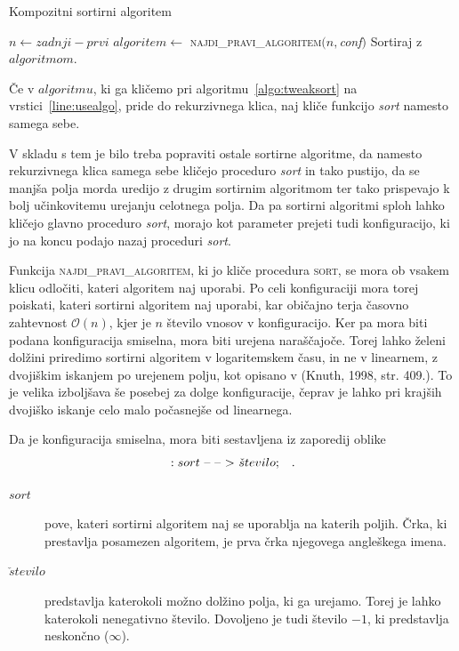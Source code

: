 \documentclass[a4paper,oneside,12pt]{article}
\newcommand{\konfarrow}{\mbox{--}~\mbox{--}~\mbox{\ensuremath{>}}}
\newcommand{\edot}{\;\;\;.}
\begin{document}
\begin{algorithm}[h!t!]
  \caption{Kompozitni sortirni algoritem}\label{algo:tweaksort}
  \begin{algorithmic}[1]
        \State $n \gets zadnji - prvi$
        \State $algoritem \gets$ \textsc{najdi\_pravi\_algoritem}$(n, $\emph{conf}$)$
        \State \label{line:usealgo}Sortiraj z $algoritmom$.
    \EndFunction
  \end{algorithmic}
\end{algorithm}

Če v $algoritmu$, ki ga kličemo pri algoritmu~\ref{algo:tweaksort} na
vrstici~\ref{line:usealgo}, pride do rekurzivnega klica, naj kliče funkcijo \emph{sort} namesto
samega sebe.

V skladu s tem je bilo treba popraviti ostale sortirne algoritme, da namesto rekurzivnega
klica samega sebe kličejo proceduro \emph{sort} in tako pustijo, da se manjša polja morda uredijo z
drugim sortirnim algoritmom ter tako prispevajo k bolj učinkovitemu urejanju celotnega polja. Da pa
sortirni algoritmi sploh lahko kličejo glavno proceduro \emph{sort}, morajo kot
parameter prejeti tudi konfiguracijo, ki jo na koncu podajo nazaj proceduri \emph{sort}.

Funkcija \textsc{najdi\_pravi\_algoritem}, ki jo kliče procedura \textsc{sort}, se mora ob vsakem klicu odločiti, kateri
algoritem naj uporabi. Po celi konfiguraciji mora torej poiskati, kateri sortirni algoritem
naj uporabi, kar običajno terja časovno zahtevnost
$\mathcal{O}(n)$, kjer je $n$ število vnosov v konfiguracijo. Ker pa mora biti podana konfiguracija
smiselna, mora biti urejena naraščajoče. Torej lahko želeni dolžini priredimo sortirni
algoritem v logaritemskem času, in ne v linearnem, z dvojiškim iskanjem po urejenem polju, 
kot opisano v (Knuth, 1998, str. 409.). To je velika izboljšava še posebej za dolge konfiguracije, čeprav je lahko
pri krajših dvojiško iskanje celo malo počasnejše od linearnega.

\pagebreak
Da je konfiguracija smiselna, mora biti sestavljena iz zaporedij oblike
\[ :sort\ \konfarrow\ \check{s}tevilo; \edot\]
\begin{description}
  \item[$sort$] pove, kateri sortirni algoritem naj se uporablja na katerih poljih. Črka, ki
    prestavlja posamezen algoritem, je prva črka njegovega angleškega imena.
  \item[$\check{s}tevilo$] predstavlja katerokoli možno dolžino polja, ki ga urejamo. Torej je lahko
    katerokoli nenegativno število. Dovoljeno je tudi število $-1$, ki predstavlja neskončno
($\infty$).
\end{description}
\end{document}
